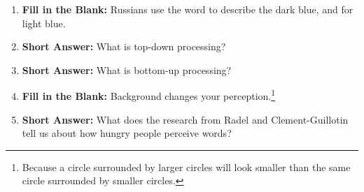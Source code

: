 \begin{enumerate}[label=\textbf{Q2.9.\arabic*}]
      \item \textbf{Fill in the Blank:} Russians use the word  to describe the dark blue, and  for light blue. \\
      
      \item \textbf{Short Answer:} What is top-down processing? \\

      \item \textbf{Short Answer:} What is bottom-up processing? \\

      \item \textbf{Fill in the Blank:} Background changes your  perception.\footnote{Because a circle surrounded by larger circles will look smaller than the same circle surrounded by smaller circles.} \\
             

      \item \textbf{Short Answer:} What does the research from Radel and Clement-Guillotin tell us about how hungry people perceive words? \\

\end{enumerate}